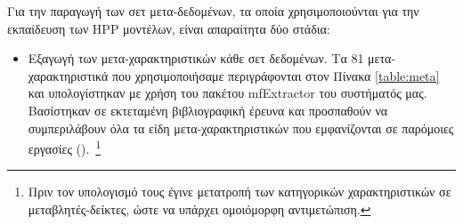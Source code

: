Για την παραγωγή των σετ μετα-δεδομένων, τα οποία χρησιμοποιούνται για την εκπαίδευση των HPP μοντέλων, είναι απαραίτητα δύο στάδια:
\begin{itemize}
	\item Εξαγωγή των μετα-χαρακτηριστικών κάθε σετ δεδομένων. Τα  81 μετα-χαρακτηριστικά που χρησιμοποιήσαμε περιγράφονται στον Πίνακα \ref{table:meta} και υπολογίστηκαν με χρήση του πακέτου mf\-Extractor του συστήματός μας. Βασίστηκαν σε εκτεταμένη βιβλιογραφική έρευνα και προσπαθούν να συμπεριλάβουν όλα τα είδη μετα-χαρακτηριστικών που εμφανίζονται σε παρόμοιες εργασίες (\citep{Brazdil2009,Reif_meta2-features:,Feurer:2014:UMI:3015544.3015549}).~\footnote{Πριν τον υπολογισμό τους έγινε μετατροπή των κατηγορικών χαρακτηριστικών σε μεταβλητές-δείκτες, ώστε να υπάρχει ομοιόμορφη αντιμετώπιση.}   
		\begin{table}[!htb]
			\begin{center}
				\caption{Λίστα μετα-χαρακτηριστικών, τα οποία χρησιμοποιήθηκαν για την εκπαίδευση των HPP μοντέλων}
				\label{table:meta}
\end{center}
\end{table}
\end{itemize}
